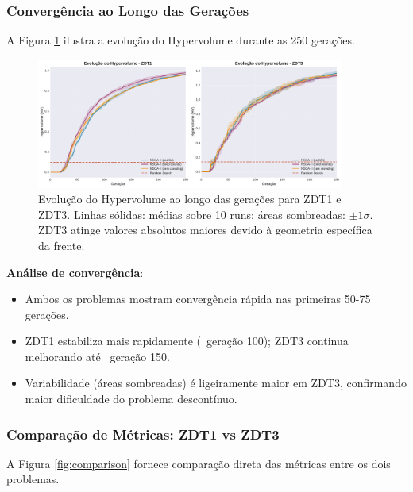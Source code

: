 \subsubsection{Convergência ao Longo das Gerações}
A Figura \ref{fig:hv_evolution} ilustra a evolução do Hypervolume durante as 250 gerações.

\begin{figure}[h]
\centering
\includegraphics[width=0.90\textwidth]{../plots/B_hypervolume_evolution_REAL.pdf}
\caption{Evolução do Hypervolume ao longo das gerações para ZDT1 e ZDT3. Linhas sólidas: médias sobre 10 runs; áreas sombreadas: $\pm 1\sigma$. ZDT3 atinge valores absolutos maiores devido à geometria específica da frente.}
\label{fig:hv_evolution}
\end{figure}

\textbf{Análise de convergência}:
\begin{itemize}
  \item Ambos os problemas mostram convergência rápida nas primeiras 50-75 gerações.
  \item ZDT1 estabiliza mais rapidamente (~geração 100); ZDT3 continua melhorando até ~geração 150.
  \item Variabilidade (áreas sombreadas) é ligeiramente maior em ZDT3, confirmando maior dificuldade do problema descontínuo.
\end{itemize}

\subsubsection{Comparação de Métricas: ZDT1 vs ZDT3}
A Figura \ref{fig:comparison} fornece comparação direta das métricas entre os dois problemas.

